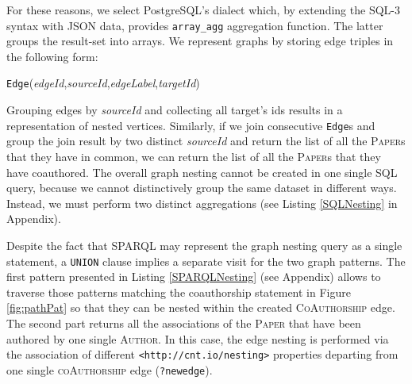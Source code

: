 For these reasons, we select PostgreSQL's dialect which, by extending the SQL-3 syntax with JSON data, provides \texttt{array\_agg} aggregation function. The latter groups the result-set into arrays.  We  represent  graphs by  storing edge triples in the following form:
\begin{center}
 \texttt{Edge}(\textit{edgeId},\;\textit{sourceId},\;\textit{edgeLabel},\;\textit{targetId})
\end{center}
Grouping edges by \textit{sourceId} and collecting all target's ids results in a representation of nested vertices. Similarly, if we join consecutive \texttt{Edge}s and group the join result by two distinct \textit{sourceId} and return the list of all the \textsc{Paper}s that they have in common, we can return the list of all the \textsc{Paper}s that they have coauthored. The overall graph nesting cannot be created in one single SQL query, because we cannot distinctively group the same dataset in different ways. Instead, we must perform two distinct aggregations (see Listing \ref{SQLNesting} in Appendix).


Despite the fact that SPARQL  may represent the graph nesting query as a single statement, a \texttt{UNION} clause implies a separate visit for the two graph patterns. The first pattern presented in Listing \ref{SPARQLNesting} (see Appendix) allows to traverse those  patterns matching the coauthorship statement in Figure \ref{fig:pathPat} so that they can be nested within the created \textsc{CoAuthorship} edge. The second part returns all the associations of the \textsc{Paper} that have been authored by one single \textsc{Author}. In this case, the edge nesting is performed via the association of different \texttt{<http://cnt.io/nesting>} properties departing from one single  \textsc{coAuthorship} edge (\texttt{?newedge}).

